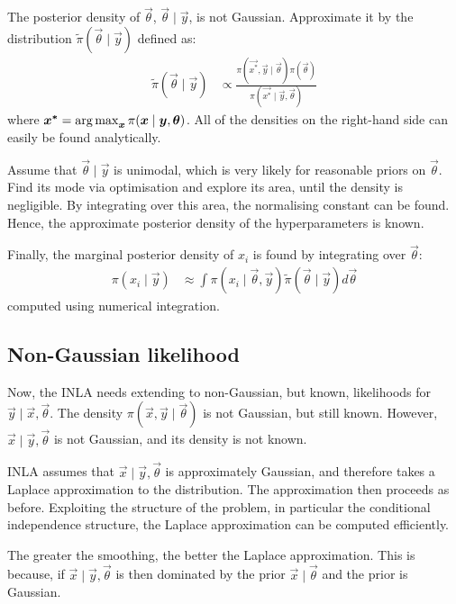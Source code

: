 \documentclass[thesis.tex]{subfiles}
\begin{document}
The posterior density of $\vec{\theta}$, $\vec{\theta }\mid \vec{y}$, is not Gaussian.
Approximate it by the distribution $\tilde\pi(\vec{\theta} \mid \vec{y})$ defined as:
\begin{align}
\tilde\pi(\vec{\theta} \mid \vec{y})
&\propto \frac{\pi(\vec{x^*}, \vec{y} \mid \vec{\theta}) \pi(\vec{\theta})}{\pi(\vec{x^*} \mid \vec{y}, \vec{\theta})}
\end{align}
where $\bm{x^*} = \operatorname*{arg\,max}_{\bm{x}} \pi(\bm{x} \mid \bm{y}, \bm{\theta})$.
All of the densities on the right-hand side can easily be found analytically.

Assume that $\vec{\theta} \mid \vec{y}$ is unimodal, which is very likely for reasonable priors on $\vec{\theta}$.
Find its mode via optimisation and explore its area, until the density is negligible.
By integrating over this area, the normalising constant can be found.
Hence, the approximate posterior density of the hyperparameters is known.

Finally, the marginal posterior density of $x_i$ is found by integrating over $\vec{\theta}$:
\begin{align}
\pi(x_i \mid \vec{y})
&\approx \int \pi(x_i \mid \vec{\theta}, \vec{y}) \tilde\pi(\vec{\theta} \mid \vec{y}) d\vec{\theta}
\end{align}
computed using numerical integration.

\subsection{Non-Gaussian likelihood}

Now, the INLA needs extending to non-Gaussian, but known, likelihoods for $\vec{y} \mid \vec{x}, \vec{\theta}$.
The density $\pi(\vec{x}, \vec{y} \mid \vec{\theta})$ is not Gaussian, but still known.
However, $\vec{x} \mid \vec{y}, \vec{\theta}$ is not Gaussian, and its density is not known.

INLA assumes that $\vec{x} \mid \vec{y}, \vec{\theta}$ is approximately Gaussian, and therefore takes a Laplace approximation to the distribution.
The approximation then proceeds as before.
Exploiting the structure of the problem, in particular the conditional independence structure, the Laplace approximation can be computed efficiently.

The greater the smoothing, the better the Laplace approximation.
This is because, if $\vec{x} \mid \vec{y}, \vec{\theta}$ is then dominated by the prior $\vec{x} \mid \vec{\theta}$ and the prior is Gaussian.
\end{document}
